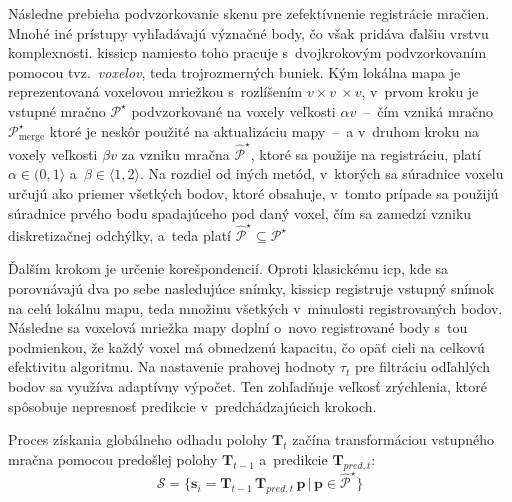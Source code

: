       Následne prebieha podvzorkovanie skenu pre zefektívnenie registrácie mračien. Mnohé iné prístupy vyhľadávajú význačné body, čo však pridáva ďalšiu vrstvu komplexnosti\@. \acrshort{kissicp} namiesto toho pracuje s~dvojkrokovým podvzorkovaním pomocou tvz.\ \emph{voxelov}, teda trojrozmerných buniek. Kým lokálna mapa je reprezentovaná voxelovou mriežkou s~rozlíšením $v \times v~\times v$, v~prvom kroku je vstupné mračno $\mathcal{P}^{\star}$ podvzorkované na voxely veľkosti $\alpha v$~--~čím vzniká mračno $\mathcal{P}^{\star}_{\mathrm{merge}}$ ktoré je neskôr použité na aktualizáciu mapy~--~a v~druhom kroku na voxely veľkosti $\beta v$ za vzniku mračna $\hat{\mathcal{P}}^{\star}$, ktoré sa použije na registráciu, platí $\alpha \in ( 0,1 \rangle$ a~$\beta \in \langle 1,2 \rangle$. Na rozdiel  od iných metód, v~ktorých sa súradnice voxelu určujú ako priemer všetkých bodov, ktoré obsahuje, v~tomto prípade sa použijú súradnice prvého bodu spadajúceho pod daný voxel, čím sa zamedzí vzniku diskretizačnej odchýlky, a~teda platí $\hat{\mathcal{P}}^{\star} \subseteq \mathcal{P}^{\star}$
      
      Ďalším krokom je určenie korešpondencií. Oproti klasickému \acrshort{icp}, kde sa porovnávajú dva po sebe nasledujúce snímky, \acrshort{kissicp} registruje vstupný snímok na celú lokálnu mapu, teda množinu všetkých v~minulosti registrovaných bodov. Následne sa voxelová mriežka mapy doplní o~novo registrované body s~tou podmienkou, že každý voxel má obmedzenú kapacitu, čo opäť cieli na celkovú efektivitu algoritmu. Na nastavenie prahovej hodnoty $\tau_t$ pre filtráciu odľahlých bodov sa využíva adaptívny výpočet. Ten zohľadňuje veľkosť zrýchlenia, ktoré spôsobuje nepresnosť predikcie v~predchádzajúcich krokoch.
      
      Proces získania globálneho odhadu polohy $\bm{T}_t$ začína transformáciou vstupného mračna pomocou predošlej polohy $\bm{T}_{t-1}$ a~predikcie $\bm{T}_{pred,t}$:
      \begin{equation}
        \mathcal{S} = \{ \bm{s}_i = \bm{T}_{t-1}\,\bm{T}_{pred,t}\,\bm{p}\, |\, \bm{p} \in \hat{\mathcal{P}}^{\star} \}
      \end{equation}

